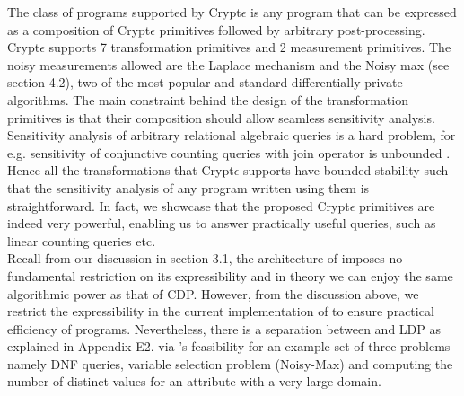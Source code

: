 \par %
The class of programs supported by Crypt$\epsilon$ is any program that can be expressed as a composition of  Crypt$\epsilon$ primitives followed by arbitrary post-processing. Crypt$\epsilon$ supports 7 transformation primitives and 2 measurement primitives. The noisy measurements allowed are the Laplace mechanism and the Noisy max (see section 4.2), two of the most popular and standard differentially private algorithms. The main constraint behind the design of the transformation primitives is that their composition should allow seamless sensitivity analysis.  Sensitivity analysis of arbitrary relational algebraic queries is a hard problem, for e.g. sensitivity of conjunctive counting queries with join operator is unbounded \cite{sensitivity}. Hence all the transformations that Crypt$\epsilon$ supports have bounded stability \cite{PINQ} such that the sensitivity analysis of any program written using them is straightforward. In fact, we showcase that the proposed Crypt$\epsilon$ primitives are indeed very powerful, enabling us to answer practically useful queries, such as linear counting queries etc. 
\\ Recall from our discussion in section 3.1, the architecture of \system imposes no fundamental restriction on its expressibility and in theory we can enjoy the same algorithmic power as that of \textsf{CDP}. However, from the discussion above, we restrict the expressibility in the current implementation of \system to ensure practical efficiency of \system programs. Nevertheless, there is a separation between \system and \textsf{LDP} as explained in Appendix E2. via \system's feasibility for an example set of three problems namely DNF queries, variable selection problem (Noisy-Max) and computing the number of distinct values for an attribute with a very large domain.
